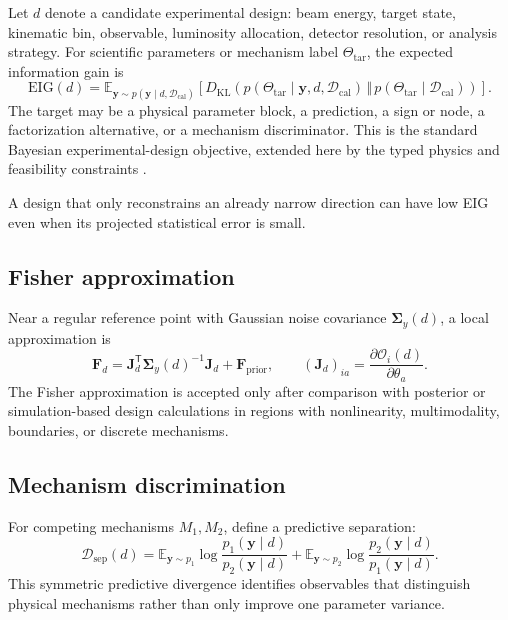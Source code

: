 \documentclass[11pt]{article}
\newcommand{\E}{\mathbb E}
\newcommand{\KL}{D_{\mathrm{KL}}}
\newcommand{\cO}{\mathcal O}
\newcommand{\cD}{\mathcal D}
\newcommand{\caldata}{\mathcal D_{\mathrm{cal}}}
\begin{document}
Let \(d\) denote a candidate experimental design: beam energy, target state,
kinematic bin, observable, luminosity allocation, detector resolution, or
analysis strategy.  For scientific parameters or mechanism label
\(\Theta_{\mathrm{tar}}\), the expected information gain is
\begin{equation}
 \mathrm{EIG}(d)
 =
 \E_{\bm y\sim p(\bm y\mid d,\caldata)}
 \left[
 \KL\!\left(
 p(\Theta_{\mathrm{tar}}\mid\bm y,d,\caldata)
 \,\Vert\,
 p(\Theta_{\mathrm{tar}}\mid\caldata)
 \right)
 \right].
 \label{eq:eig}
\end{equation}
The target may be a physical parameter block, a prediction, a sign or node, a
factorization alternative, or a mechanism discriminator.  This is the standard
Bayesian experimental-design objective, extended here by the typed physics and
feasibility constraints \cite{ChalonerVerdinelli1995,CoonsHuan2025}.

A design that only reconstrains an already narrow direction can have low EIG
even when its projected statistical error is small.

\subsection{Fisher approximation}

Near a regular reference point with Gaussian noise covariance
\(\bm\Sigma_y(d)\), a local approximation is
\begin{equation}
 \bm F_d
 =
 \bm J_d^{\mathsf T}
 \bm\Sigma_y(d)^{-1}
 \bm J_d
 +
 \bm F_{\mathrm{prior}},
 \qquad
 (\bm J_d)_{ia}
 =
 \frac{\partial \cO_i(d)}{\partial\theta_a}.
 \label{eq:fisher-design}
\end{equation}
The Fisher approximation is accepted only after comparison with posterior or
simulation-based design calculations in regions with nonlinearity,
multimodality, boundaries, or discrete mechanisms.

\subsection{Mechanism discrimination}

For competing mechanisms \(M_1,M_2\), define a predictive separation:
\begin{equation}
 \cD_{\mathrm{sep}}(d)
 =
 \E_{\bm y\sim p_1}
 \log\frac{p_1(\bm y\mid d)}{p_2(\bm y\mid d)}
 +
 \E_{\bm y\sim p_2}
 \log\frac{p_2(\bm y\mid d)}{p_1(\bm y\mid d)} .
 \label{eq:mechanism-separation}
\end{equation}
This symmetric predictive divergence identifies observables that distinguish
physical mechanisms rather than only improve one parameter variance.
\end{document}
